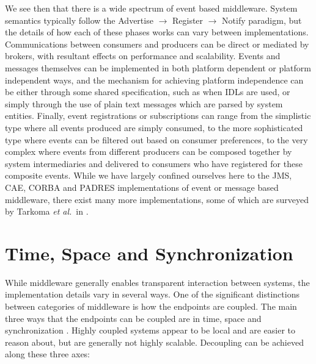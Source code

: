\documentclass{acm_proc_article-sp}
\def\etal{{\it et al.\/}}
\begin{document}
We see then that there is a wide spectrum of event based middleware. System semantics typically follow the Advertise $\rightarrow$ Register $\rightarrow$ Notify paradigm, but the details of how each of these phases works can vary between implementations. Communications between consumers and producers can be direct or mediated by brokers, with resultant effects on performance and scalability. Events and messages themselves can be implemented in both platform dependent or platform independent ways, and the mechanism for achieving platform independence can be either through some shared specification, such as when IDLs are used, or simply through the use of plain text messages which are parsed by system entities. Finally, event registrations or subscriptions can range from the simplistic type where all events produced are simply consumed, to the more sophisticated type where events can be filtered out based on consumer preferences, to the very complex where events from different producers can be composed together by system intermediaries and delivered to consumers who have registered for these composite events. While we have largely confined ourselves here to the JMS, CAE, CORBA and PADRES implementations of event or message based middleware, there exist many more implementations, some of which are surveyed by Tarkoma \etal\ in \cite{Tarkoma:2006p6862}.




\section{Time, Space and Synchronization}
\label{sec:timespace}

While middleware generally enables transparent interaction between systems, the implementation details vary in several ways. One of the significant distinctions between categories of middleware is how the endpoints are coupled. The main three ways that the endpoints can be coupled are in time, space and synchronization \cite{Eugster:2003p6725}. Highly coupled systems appear to be local and are easier to reason about, but are generally not highly scalable. Decoupling can be achieved along these three axes:
\end{document}
